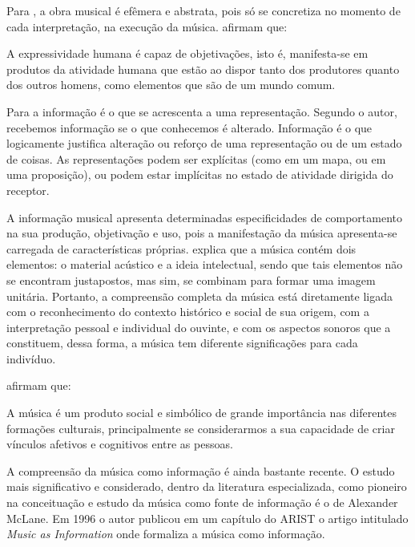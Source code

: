 Para , a obra musical é efêmera e abstrata, pois só se concretiza no momento de cada interpretação, na execução da música.  afirmam que:

\begin{citacao}
A expressividade humana é capaz de objetivações, isto é, manifesta-se em produtos da atividade humana que estão ao dispor tanto dos produtores quanto dos outros homens, como elementos que são de um mundo comum.
\end{citacao}

Para  a informação é o que se acrescenta a uma representação. Segundo o autor, recebemos informação se o que conhecemos é alterado. Informação é o que logicamente justifica alteração ou reforço de uma representação ou de um estado de coisas. As representações podem ser explícitas (como em um mapa, ou em uma proposição), ou podem estar implícitas no estado de atividade dirigida do receptor.

A informação musical apresenta determinadas especificidades de comportamento na sua produção, objetivação e uso, pois a manifestação da música apresenta-se carregada de características próprias.  explica que a música contém dois elementos: o material acústico e a ideia intelectual, sendo que tais elementos não se encontram justapostos, mas sim, se combinam para formar uma imagem unitária. Portanto, a compreensão completa da música está diretamente ligada com o reconhecimento do contexto histórico e social de sua origem, com a interpretação pessoal e individual do ouvinte, e com os aspectos sonoros que a constituem, dessa forma, a música tem diferente significações para cada indivíduo.

 afirmam que:

\begin{citacao}
A música é um produto social e simbólico de grande importância nas diferentes formações culturais, principalmente se considerarmos a sua capacidade de criar vínculos afetivos e cognitivos entre as pessoas.
\end{citacao}

A compreensão da música como informação é ainda bastante recente. O estudo mais significativo e considerado, dentro da literatura especializada, como pioneiro na conceituação e estudo da música como fonte de informação é o de Alexander McLane. Em 1996 o autor publicou em um capítulo do ARIST  o artigo intitulado \textit{Music as Information} onde formaliza a música como informação.

